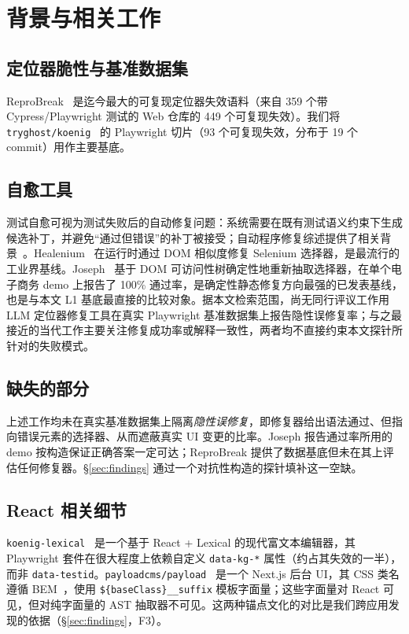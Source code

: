 \section{背景与相关工作}
\label{sec:background}

\subsection{定位器脆性与基准数据集}
ReproBreak~\cite{mouraReproBreak2026} 是迄今最大的可复现定位器失效语料（来自 359 个带 Cypress/Playwright 测试的 Web 仓库的 449 个可复现失效）。我们将 \texttt{tryghost/koenig}~\cite{koenig} 的 Playwright 切片（93 个可复现失效，分布于 19 个 commit）用作主要基底。

\subsection{自愈工具}
测试自愈可视为测试失败后的自动修复问题：系统需要在既有测试语义约束下生成候选补丁，并避免“通过但错误”的补丁被接受；自动程序修复综述提供了相关背景~\cite{li2019programRepair}。Healenium~\cite{healenium} 在运行时通过 DOM 相似度修复 Selenium 选择器，是最流行的工业界基线。Joseph~\cite{joseph2026zerocost} 基于 DOM 可访问性树确定性地重新抽取选择器，在单个电子商务 demo 上报告了 100\% 通过率，是确定性静态修复方向最强的已发表基线，也是与本文 L1 基底最直接的比较对象。据本文检索范围，尚无同行评议工作用 LLM 定位器修复工具在真实 Playwright 基准数据集上报告隐性误修复率；与之最接近的当代工作主要关注修复成功率或解释一致性，两者均不直接约束本文探针所针对的失败模式。

\subsection{缺失的部分}
上述工作均未在真实基准数据集上隔离\emph{隐性误修复}，即修复器给出语法通过、但指向错误元素的选择器、从而遮蔽真实 UI 变更的比率。Joseph 报告通过率所用的 demo 按构造保证正确答案一定可达；ReproBreak 提供了数据基底但未在其上评估任何修复器。\S\ref{sec:findings} 通过一个对抗性构造的探针填补这一空缺。

\subsection{React 相关细节}
\texttt{koenig-lexical}~\cite{lexicalRichText, koenig} 是一个基于 React + Lexical 的现代富文本编辑器，其 Playwright 套件在很大程度上依赖自定义 \texttt{data-kg-*} 属性（约占其失效的一半），而非 \texttt{data-testid}。\texttt{payloadcms/payload}~\cite{payloadCMS} 是一个 Next.js 后台 UI，其 CSS 类名遵循 BEM~\cite{bemMethodology}，使用 \texttt{\$\{baseClass\}\_\_suffix} 模板字面量；这些字面量对 React 可见，但对纯字面量的 AST 抽取器不可见。这两种锚点文化的对比是我们跨应用发现的依据（\S\ref{sec:findings}，F3）。
